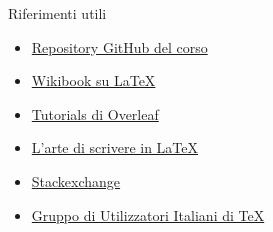 \begin{frame}{Riferimenti utili}
    \begin{itemize}
      \item{\href{https://github.com/latex1819unipd/Corso-Latex}
      {Repository GitHub del corso}}
      \item {\href{https://en.wikibooks.org/wiki/LaTeX/}{Wikibook su \LaTeX}}
      \item {\href{https://it.overleaf.com/learn/latex/Tutorials}{Tutorials di Overleaf}}
      \item {\href{http://www.lorenzopantieri.net/LaTeX_files/ArteLaTeX.pdf}
{L'arte di scrivere in \LaTeX}}
      \item {\href{https://tex.stackexchange.com/}{Stackexchange}}
      \item {\href{http://www.guitex.org/}
{Gruppo di Utilizzatori Italiani di TeX}}
    \end{itemize}
\end{frame}

